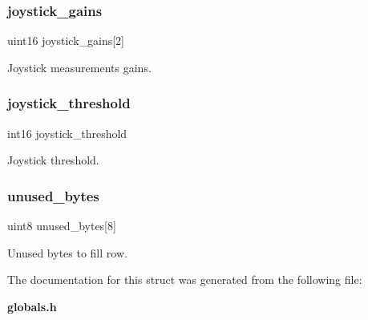 \subsubsection{joystick\+\_\+gains}
{\footnotesize\ttfamily uint16 joystick\+\_\+gains[2]}

Joystick measurements gains. \mbox{\label{structst___j_o_y__spec_ae28d535845c3d16074a1e77297c3f9b8}} 
\subsubsection{joystick\+\_\+threshold}
{\footnotesize\ttfamily int16 joystick\+\_\+threshold}

Joystick threshold. \mbox{\label{structst___j_o_y__spec_ab2479545d632531da12aab41325a8d8f}} 
\subsubsection{unused\+\_\+bytes}
{\footnotesize\ttfamily uint8 unused\+\_\+bytes[8]}

Unused bytes to fill row. 

The documentation for this struct was generated from the following file\+:\begin{DoxyCompactItemize}
\item 
\textbf{ globals.\+h}\end{DoxyCompactItemize}
